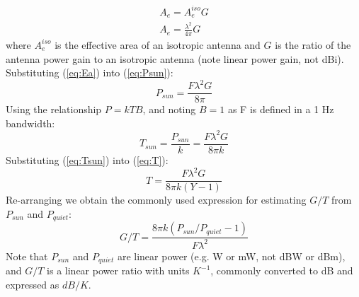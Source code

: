 \documentclass{article}
\begin{document}
\begin{equation}
\begin{split} \label{eq:Ea}
A_e = A_e^{iso}G \\
A_e = \frac{\lambda^2}{4\pi}G
\end{split}
\end{equation}
where $A_e^{iso}$ is the effective area of an isotropic antenna and $G$ is the ratio of the antenna power gain to an isotropic antenna (note linear power gain, not dBi). Substituting (\ref{eq:Ea}) into (\ref{eq:Psun}):
\begin{equation}
P_{sun} = \frac{F\lambda^2G}{8\pi}
\end{equation}
Using the relationship $P=kTB$, and noting $B=1$ as F is defined in a 1 Hz bandwidth:
\begin{equation} \label{eq:Tsun}
T_{sun} = \frac{P_{sun}}{k} = \frac{F\lambda^2G}{8\pi k}
\end{equation}
Substituting (\ref{eq:Tsun}) into (\ref{eq:T}):
\begin{equation}
T = \frac{F\lambda^2G}{8\pi k(Y-1)}
\end{equation}
Re-arranging we obtain the commonly used expression for estimating $G/T$ from $P_{sun}$ and $P_{quiet}$:
\begin{equation}
G/T = \frac{8\pi k(P_{sun}/P_{quiet}-1)}{F\lambda^2}
\end{equation}
Note that $P_{sun}$ and $P_{quiet}$ are linear power (e.g. W or mW, not dBW or dBm), and $G/T$ is a linear power ratio with units $K^{-1}$, commonly converted to dB and expressed as $dB/K$.


\end{document}
